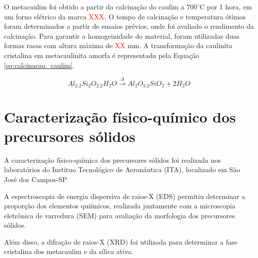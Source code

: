 O metacaulim foi obtido a partir da calcinação do caulim a $700^\circ$C por 1 hora, em um forno elétrico da marca \textcolor{red}{XXX}.
O tempo de calcinação e temperatura ótimos foram determinados a partir de ensaios prévios, onde foi avaliado o rendimento da calcinação.
Para garantir a homogeinidade do material, foram utilizadas duas formas rasas com altura máxima de \textcolor{red}{XX} mm.
A transformação da caulinita cristalina em metacaulinita amorfa é representada pela Equação \ref{eq:calcinacao_caulim}.

\begin{equation}
    \label{eq:calcinacao_caulim}
        Al_2.2Si_2O_2.2H_2O \xrightarrow{\Delta} Al_2O_3.2SiO_2 + 2 H_2O
\end{equation}

\section{Caracterização físico-químico dos precursores sólidos}
\label{sec:caracterizacao_fisico_quimica_dos_precursores_solidos}

A caracterização físico-química dos precursores sólidos foi realizada nos laboratórios do Instituo Tecnológico de Aeronáutica (ITA), localizado em São José dos Campos-SP.

A espectroscopia de energia dispersiva de raios-X (EDS) permitiu determinar a proporção dos elementos quiímicos, realizada juntamente com a microscopia eletrônica de varredura (SEM) para avaliação da morfologia dos precursores sólidos.

Além disso, a difração de raios-X (XRD) foi utilizada para determinar a fase cristalina dos metacaulim e da sílica ativa.


